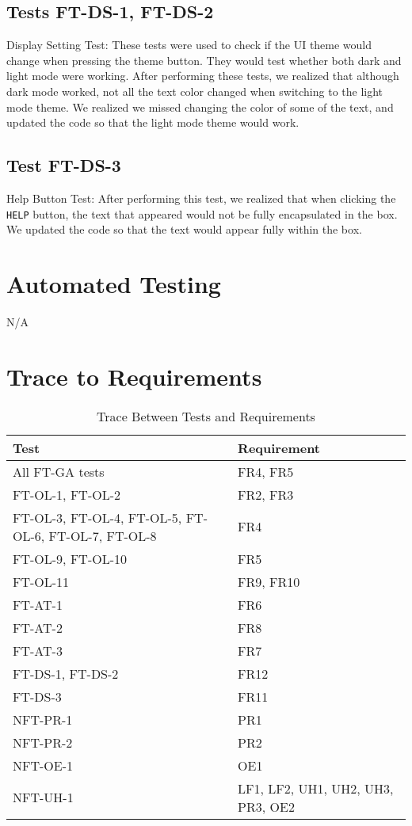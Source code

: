\documentclass[12pt, titlepage]{article}
\begin{document}
\subsection{Tests FT-DS-1, FT-DS-2}
Display Setting Test: These tests were used to check if the UI theme would change when pressing the theme button. They would test whether both dark and light mode were working. After performing these tests, we realized that although dark mode worked, not all the text color changed when switching to the light mode theme. We realized we missed changing the color of some of the text, and updated the code so that the light mode theme would work.

\subsection{Test FT-DS-3}
Help Button Test: After performing this test, we realized that when clicking the \texttt{HELP} button, the text that appeared would not be fully encapsulated in the box. We updated the code so that the text would appear fully within the box.

\section{Automated Testing}
N/A

\section{Trace to Requirements}

\begin{table}[H]
\centering
\begin{tabular}{p{} p{}}
\toprule
\textbf{Test} & \textbf{Requirement}\\
\midrule
All FT-GA tests & FR4, FR5\\
FT-OL-1, FT-OL-2 & FR2, FR3\\
FT-OL-3, FT-OL-4, FT-OL-5, FT-OL-6, FT-OL-7, FT-OL-8 & FR4\\
FT-OL-9, FT-OL-10 & FR5\\
FT-OL-11 & FR9, FR10\\
FT-AT-1 & FR6\\
FT-AT-2 & FR8\\
FT-AT-3 & FR7\\
FT-DS-1, FT-DS-2 & FR12\\
FT-DS-3 & FR11\\
NFT-PR-1 & PR1\\
NFT-PR-2 & PR2\\
NFT-OE-1 & OE1\\
NFT-UH-1 & LF1, LF2, UH1, UH2, UH3, PR3, OE2\\
\bottomrule
\end{tabular}
\caption{Trace Between Tests and Requirements}
\label{testsToReqs}
\end{table}
		
\end{document}
